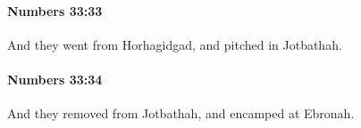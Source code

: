 		\paragraph{Numbers 33:33} %
			\label{NUMBERS-33-33}

			And they went from Horhagidgad, and pitched in Jotbathah.


		\paragraph{Numbers 33:34} %
			\label{NUMBERS-33-34}

			And they removed from Jotbathah, and encamped at Ebronah.


